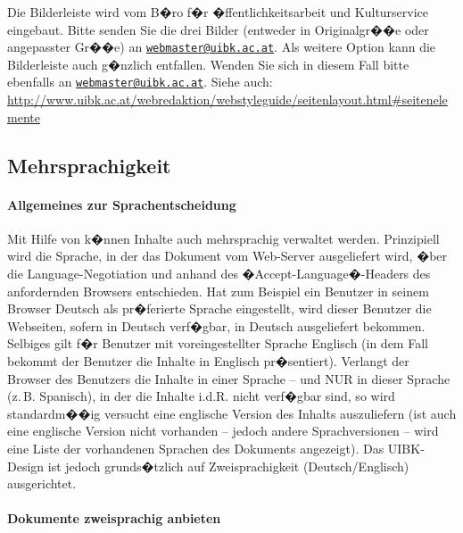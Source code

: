 Die Bilderleiste wird vom B�ro f�r �ffentlichkeitsarbeit und Kulturservice eingebaut.
Bitte senden Sie die drei Bilder (entweder in Originalgr��e oder angepasster Gr��e)
an \href{mailto:webmaster@uibk.ac.at}{\nolinkurl{webmaster@uibk.ac.at}}. Als weitere Option kann die Bilderleiste auch g�nzlich
entfallen. Wenden Sie sich in diesem Fall bitte ebenfalls an \href{mailto:webmaster@uibk.ac.at}{\nolinkurl{webmaster@uibk.ac.at}}.
Siehe auch: \url{http://www.uibk.ac.at/webredaktion/webstyleguide/seitenlayout.html\#seitenelemente}

\subsection{Mehrsprachigkeit}
\label{zweisprachigkeit}

\paragraph{Allgemeines zur Sprachentscheidung}

Mit Hilfe von  k�nnen Inhalte auch mehrsprachig verwaltet werden. Prinzipiell
wird die Sprache, in der das Dokument vom Web-Server ausgeliefert wird, �ber die
Language-Negotiation und anhand des �Accept-Language�-Headers des
anfordernden Browsers entschieden. Hat zum Beispiel ein Benutzer in seinem
Browser Deutsch als pr�ferierte Sprache eingestellt, wird dieser Benutzer die
Webseiten, sofern in Deutsch verf�gbar, in Deutsch ausgeliefert bekommen.
Selbiges gilt f�r Benutzer mit voreingestellter Sprache Englisch (in dem Fall
bekommt der Benutzer die Inhalte in Englisch pr�sentiert). Verlangt der Browser des
Benutzers die Inhalte in einer Sprache -- und NUR in dieser Sprache (z.\,B.
Spanisch), in der die Inhalte i.d.R. nicht verf�gbar sind, so wird standardm��ig
versucht eine englische Version des Inhalts auszuliefern (ist auch eine englische
Version nicht vorhanden -- jedoch andere Sprachversionen -- wird eine Liste der
vorhandenen Sprachen des Dokuments angezeigt). Das UIBK-Design ist jedoch
grunds�tzlich auf Zweisprachigkeit (Deutsch/Englisch) ausgerichtet.

\paragraph{Dokumente zweisprachig anbieten}

